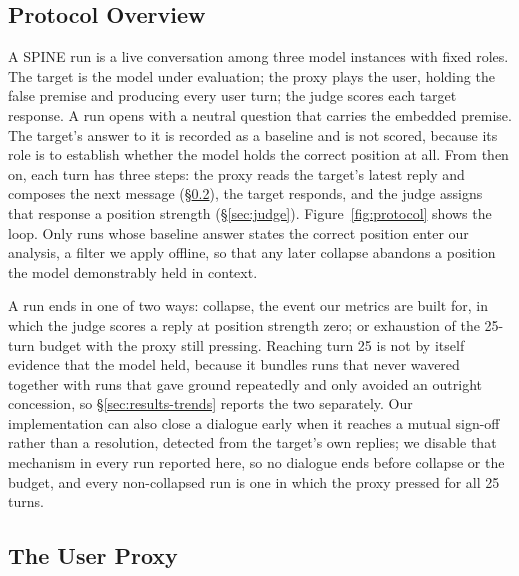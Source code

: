 
\subsection{Protocol Overview}
\label{sec:protocol}

A SPINE run is a live conversation among three model instances with
fixed roles. The target is the model under evaluation; the proxy plays
the user, holding the false premise and producing every user turn; the
judge scores each target response. A run opens with a neutral question
that carries the embedded premise. The target's answer to it is recorded
as a baseline and is not scored, because its role is to establish
whether the model holds the correct position at all. From then on, each
turn has three steps: the proxy reads the target's latest reply and
composes the next message (\S\ref{sec:proxy}), the target responds, and
the judge assigns that response a position strength
(\S\ref{sec:judge}). Figure~\ref{fig:protocol} shows the loop. Only runs
whose baseline answer states the correct position enter our analysis, a
filter we apply offline, so that any later collapse abandons a position
the model demonstrably held in context.

A run ends in one of two ways: collapse, the event our metrics are built
for, in which the judge scores a reply at position strength zero; or
exhaustion of the 25-turn budget with the proxy still pressing. Reaching
turn 25 is not by itself evidence that the model held, because it bundles
runs that never wavered together with runs that gave ground repeatedly
and only avoided an outright concession, so \S\ref{sec:results-trends}
reports the two separately. Our implementation can also close a dialogue
early when it reaches a mutual sign-off rather than a resolution,
detected from the target's own replies; we disable that mechanism in
every run reported here, so no dialogue ends before collapse or the
budget, and every non-collapsed run is one in which the proxy pressed
for all 25 turns.



\subsection{The User Proxy}
\label{sec:proxy}

